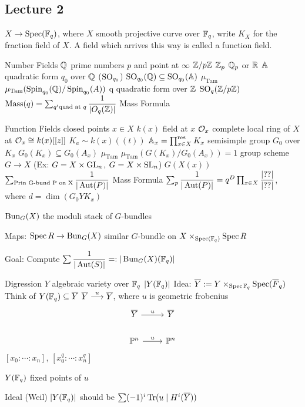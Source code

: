 \newpage
\subsection{Lecture 2}


$X \to \spec(\F_q)$, where $X$ smooth projective curve over $\F_q$, write $K_X$ for the fraction field of $X$. A field which arrives this way is called a function field.

\begin{minipage}{0.45\textwidth}
Number Fields
$\Q$ prime numbers $p$ and point at $\infty$
$\Z/p\Z$
$\Z_p$
$\Q_p$ or $\R$
$\A$
quadratic form $q_0$ over $\Q$ ($\so_{q_0}$)
$\so_{q_0}(\Q) \subseteq \so_{q_0}(\A)$
$\mu_\text{Tam}$
$\mu_\text{Tam}(\spin_{q_0}(\Q)/ \spin_{q_0}(A))$
q quadratic form over $\Z$
$\so_q(\Z/p\Z)$
$\mass(q)= \sum_{q' \text{quad at }q} \dfrac{1}{|O_q(\Z)|}$
Mass Formula
\end{minipage} %
%
%
\begin{minipage}{0.5\textwidth}
Function Fields
closed points $x \in X$
$k(x)$ field at $x$
$\O_x$ complete local ring of $X$ at $\O_x \cong k(x)[[z]]$
$K_a \sim k(x)((t))$
$\A_x= \prod_{x \in X}^\text{res} K_x$
semisimple group $G_0$ over $K_x$
$G_0(K_x) \subseteq G_0(A_x)$
$\mu_\text{Tam}$
$\mu_\text{Tam}(G(K_x)/G_0(A_x))=1$
group scheme $G \to X$ (Ex: $G= X \times \gl_n$, $G= X \times \sl_n$)
$G(X(x))$
$\sum_{\text{Prin G-bund P on X}} \dfrac{1}{|\Aut(P)|}$
Mass Formula $\sum_p \dfrac{1}{|\Aut(P)|}= q^D \prod_{x \in X} \dfrac{|??|}{|??|}$, where $d= \dim(G_0 Y K_x)$
\end{minipage}


$\bun_G(X)$ the moduli stack of $G$-bundles

Maps: $\spec R \to \bun_G(X)$
similar $G$-bundle on $X \times_{\spec(\F_q)} \spec R$

Goal: 
Compute $\sum \dfrac{1}{|\Aut(S)|} =: |\bun_G(X)(\F_q)|$

Digression
$Y$ algebraic variety over $\F_q$
$|Y(\F_q)|$
Idea: $\ov{Y}:= Y \times_{\spec \F_q} \spec(\ov{F}_q)$
Think of $Y(\F_q) \subseteq \ov{Y}$
$\ov{Y} \ma{u} \ov{Y}$, where $u$ is geometric frobenius 
	\[
	\begin{tikzcd}
	\ov{Y} \arrow{r}{u} & \ov{Y} \\
	\P^n \arrow{r}{u} & \P^n
	\end{tikzcd}
	\]
$[x_0:\cdots:x_n]$, $[x_0^q:\cdots:x_n^q]$

$Y(\F_q)$ fixed points of $u$


Ideal (Weil)
$|Y(\F_q)|$ should be $\sum (-1)^i \tr(u \;|\; H^i(\ov{Y}))$


